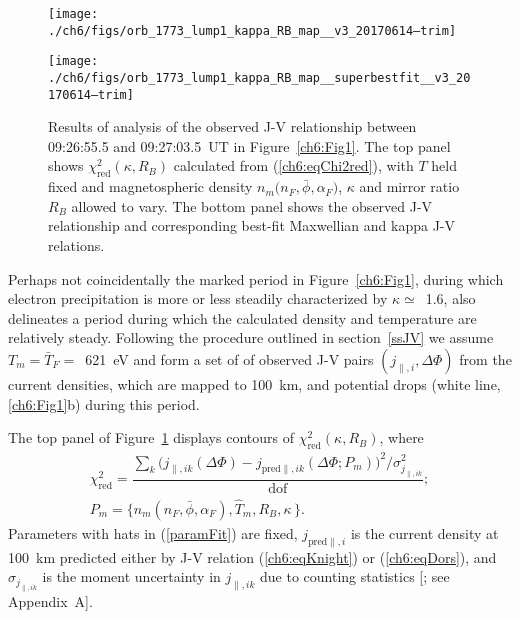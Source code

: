
  \begin{figure}
    \centering
    \noindent\texttt{[image: ./ch6/figs/orb\_1773\_lump1\_kappa\_RB\_map\_\_v3\_20170614--trim]}

    \vspace{1cm}

    \noindent\texttt{[image: ./ch6/figs/orb\_1773\_lump1\_kappa\_RB\_map\_\_superbestfit\_\_v3\_20170614--trim]}

    \caption[Orbit 1773: Reduced chi-squared values for observed J-V
    relationship with $T$ held fixed and magnetospheric density
    $n_m \big ( n_F, \bar{\phi}, \alpha_F \big )$ $\kappa$ and $R_B$ allowed to
    vary, and corresponding best-fit J-V curves.]{Results of analysis of the
      observed J-V relationship between 09:26:55.5 and 09:27:03.5~UT in
      Figure~\ref{ch6:Fig1}. The top panel shows
      $\chi^2_{\mathrm{red}} ( \kappa, R_B)$ calculated from
      (\ref{ch6:eqChi2red}), with $T$ held fixed and magnetospheric density
      $n_m \big ( n_F, \bar{\phi}, \alpha_F \big )$, $\kappa$ and mirror ratio
      $R_B$ allowed to vary. The bottom panel shows the observed J-V
      relationship and corresponding best-fit Maxwellian and kappa J-V
      relations.}
    \label{ch6:Fig3}
  \end{figure}


  Perhaps not coincidentally the marked period in Figure~\ref{ch6:Fig1}, during
  which electron precipitation is more or less steadily characterized by
  $\kappa \simeq$~1.6, also delineates a period during which the calculated
  density and temperature are relatively steady. Following the procedure
  outlined in section~\ref{ssJV} we assume $T_m = \bar{T}_F =$~621~eV and form a
  set of of observed J-V pairs $( j_{\parallel,i} , \Delta \Phi )$ from the
  current densities, which are mapped to 100~km, and potential drops (white
  line, \ref{ch6:Fig1}b) during this period.

  The top panel of Figure~\ref{ch6:Fig3} displays contours of
  $\chi^2_{\textrm{red}} ( \kappa, R_B )$, where
  \begin{subequations}
    \begin{align} \chi^2_{\mathrm{red}} = \dfrac{\sum_k \Big ( j_{\parallel,i k} (\Delta \Phi) - j_{\textrm{pred}\parallel,i k}(\Delta \Phi; P_m) \Big )^2 \Big / \sigma_{j_{\parallel,i k}}^2}{\mathrm{dof}}; \label{ch6:eqChi2red} \\
      P_m = \Big \{ n_m ( \hat{n}_F, \bar{\phi} , \alpha_F ), \hat{T}_m, R_B,
      \kappa \, \Big \}. \label{paramFit}
    \end{align}
  \end{subequations}
  Parameters with hats in (\ref{paramFit}) are fixed,
  $j_{\textrm{pred}\parallel,i} $ is the current density at 100~km predicted
  either by J-V relation (\ref{ch6:eqKnight}) or (\ref{ch6:eqDors}), and
  $\sigma_{j_{\parallel,i k}}$ is the moment uncertainty in $j_{\parallel,i k}$
  due to counting statistics [\citealp{Gershman2015}; see Appendix~A].

